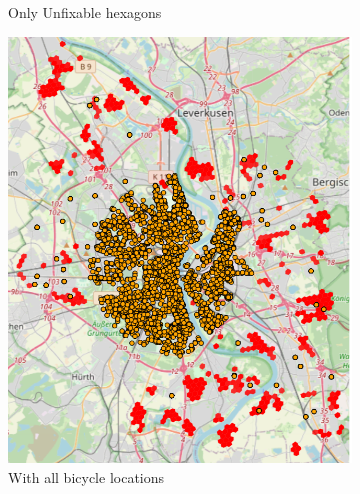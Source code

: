 \begin{figure}
\begin{subfigure}[b]{0.30\textwidth}
         \caption{Only Unfixable hexagons}
         \label{fig:only_unfixable_hexagons}
     \end{subfigure}
     \hfill
     \begin{subfigure}[b]{0.30\textwidth}
         \centering
         \includegraphics[width=\textwidth]{Figures/results/problematic_hexagons/unfixable_with_bicycles.png}
         \caption{With all bicycle locations}
         \label{fig:unfixable_with_bicycles}
     \end{subfigure}
     \hfill
     \begin{subfigure}[b]{0.30\textwidth}
         \centering

\end{subfigure}
\end{figure}
